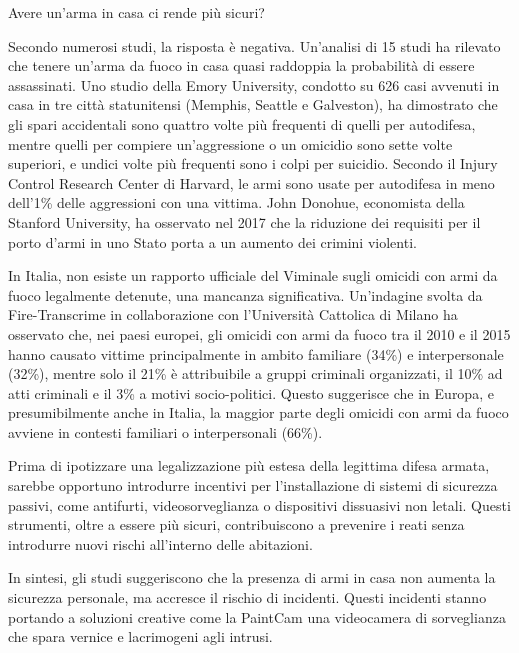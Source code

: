 \documentclass[12pt]{book} %
\begin{document}
\begin{mdframed}[linewidth=1pt]
Avere un'arma in casa ci rende più sicuri?

Secondo numerosi studi, la risposta è negativa. Un'analisi di 15 studi ha rilevato che tenere un'arma da fuoco in casa quasi raddoppia la probabilità di essere assassinati. Uno studio della Emory University, condotto su 626 casi avvenuti in casa in tre città statunitensi (Memphis, Seattle e Galveston), ha dimostrato che gli spari accidentali sono quattro volte più frequenti di quelli per autodifesa, mentre quelli per compiere un'aggressione o un omicidio sono sette volte superiori, e undici volte più frequenti sono i colpi per suicidio. Secondo il Injury Control Research Center di Harvard, le armi sono usate per autodifesa in meno dell'1\% delle aggressioni con una vittima. John Donohue, economista della Stanford University, ha osservato nel 2017 che la riduzione dei requisiti per il porto d'armi in uno Stato porta a un aumento dei crimini violenti.

In Italia, non esiste un rapporto ufficiale del Viminale sugli omicidi con armi da fuoco legalmente detenute, una mancanza significativa. Un’indagine svolta da Fire-Transcrime in collaborazione con l'Università Cattolica di Milano ha osservato che, nei paesi europei, gli omicidi con armi da fuoco tra il 2010 e il 2015 hanno causato vittime principalmente in ambito familiare (34\%) e interpersonale (32\%), mentre solo il 21\% è attribuibile a gruppi criminali organizzati, il 10\% ad atti criminali e il 3\% a motivi socio-politici. Questo suggerisce che in Europa, e presumibilmente anche in Italia, la maggior parte degli omicidi con armi da fuoco avviene in contesti familiari o interpersonali (66\%).

Prima di ipotizzare una legalizzazione più estesa della legittima difesa armata, sarebbe opportuno introdurre incentivi per l'installazione di sistemi di sicurezza passivi, come antifurti, videosorveglianza o dispositivi dissuasivi non letali. Questi strumenti, oltre a essere più sicuri, contribuiscono a prevenire i reati senza introdurre nuovi rischi all'interno delle abitazioni.

In sintesi, gli studi suggeriscono che la presenza di armi in casa non aumenta la sicurezza personale, ma accresce il rischio di incidenti. Questi incidenti stanno portando a soluzioni creative come la PaintCam una videocamera di sorveglianza che spara vernice e lacrimogeni agli intrusi.
\end{mdframed}
\end{document}

